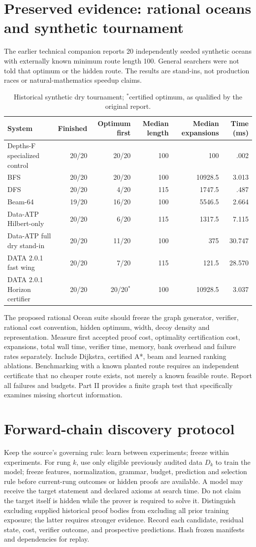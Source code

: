 \documentclass[11pt]{article}
\theoremstyle{definition}\newtheorem{definition}[theorem]{Definition}\newtheorem{example}[theorem]{Example}\newtheorem{conjecture}[theorem]{Conjecture}
\begin{document}
\section{Preserved evidence: rational oceans and synthetic tournament}
The earlier technical companion reports 20 independently seeded synthetic oceans with externally known minimum route length 100. General searchers were not told that optimum or the hidden route. The results are stand-ins, not production races or natural-mathematics speedup claims.
\begin{table}[ht]\centering\scriptsize
\begin{tabularx}{\linewidth}{Xrrrrr}\toprule System&Finished&Optimum first&Median length&Median expansions&Time (ms)\\\midrule
Depths-F specialized control&20/20&20/20&100&100&.002\\BFS&20/20&20/20&100&10928.5&3.013\\DFS&20/20&4/20&115&1747.5&.487\\Beam-64&19/20&16/20&100&5546.5&2.664\\Data-ATP Hilbert-only&20/20&6/20&115&1317.5&7.115\\Data-ATP full dry stand-in&20/20&11/20&100&375&30.747\\DATA 2.0.1 fast wing&20/20&7/20&115&121.5&28.570\\DATA 2.0.1 Horizon certifier&20/20&20/20$^*$&100&10928.5&3.037\\\bottomrule\end{tabularx}
\caption{Historical synthetic dry tournament; $^*$certified optimum, as qualified by the original report.}\end{table}
The proposed rational Ocean suite should freeze the graph generator, verifier, rational cost convention, hidden optimum, width, decoy density and representation. Measure first accepted proof cost, optimality certification cost, expansions, total wall time, verifier time, memory, bank overhead and failure rates separately. Include Dijkstra, certified A*, beam and learned ranking ablations. Benchmarking with a known planted route requires an independent certificate that no cheaper route exists, not merely a known feasible route. Report all failures and budgets. Part II provides a finite graph test that specifically examines missing shortcut information.
\section{Forward-chain discovery protocol}\label{sec:protocol}
Keep the source's governing rule: learn between experiments; freeze within experiments. For rung $k$, use only eligible previously audited data $D_k$ to train the model; freeze features, normalization, grammar, budget, prediction and selection rule before current-rung outcomes or hidden proofs are available. A model may receive the target statement and declared axioms at search time. Do not claim the target itself is hidden while the prover is required to solve it. Distinguish excluding supplied historical proof bodies from excluding all prior training exposure; the latter requires stronger evidence. Record each candidate, residual state, cost, verifier outcome, and prospective predictions. Hash frozen manifests and dependencies for replay.
\end{document}
